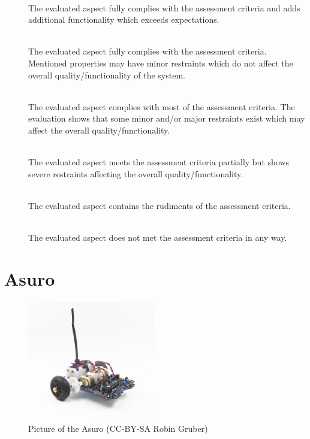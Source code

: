 \begin{description}
\item[] \hfill \\The evaluated aspect fully complies with the assessment criteria and adds additional functionality which exceeds expectations. 
\item[] \hfill \\The evaluated aspect fully complies with the assessment criteria. Mentioned properties may have minor restraints which do not affect the overall quality/functionality of the system.
\item[] \hfill \\The evaluated aspect complies with most of the assessment criteria. The evaluation shows that some minor and/or major restraints exist which may affect the overall quality/functionality.
\item[] \hfill \\The evaluated aspect meets the assessment criteria partially but shows severe restraints affecting the overall quality/functionality.
\item[] \hfill \\The evaluated aspect contains the rudiments of the assessment criteria.
\item[] \hfill \\The evaluated aspect does not met the assessment criteria in any way. 
\end{description}

\section{Asuro}
\begin{figure}[h!]
  \centering
  \includegraphics[width=0.5\textwidth]{images/asuro.jpg}
  \caption{Picture of the Asuro (CC-BY-SA Robin Gruber)}
\end{figure}

